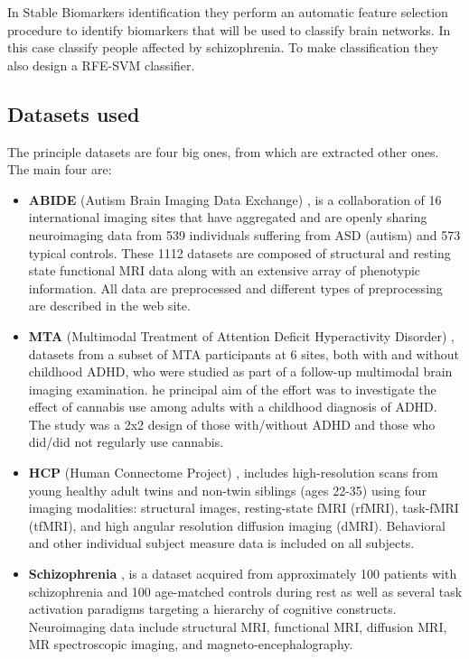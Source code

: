 In Stable Biomarkers identification they perform an automatic feature selection procedure to identify biomarkers that will be used to classify brain networks. In this case classify people affected by schizophrenia. To make classification they also design a RFE-SVM classifier. 

\subsection{Datasets used}
The principle datasets are four big ones, from which are extracted other ones. The main four are:
\begin{itemize}
	\item \textbf{ABIDE} (Autism Brain Imaging Data Exchange) \cite{Cameron2013TheNB}, is a collaboration of 16 international imaging sites that have aggregated and are openly sharing neuroimaging data from 539 individuals suffering from ASD (autism) and 573 typical controls. These 1112 datasets are composed of structural and resting state functional MRI data along with an extensive array of phenotypic information. All data are preprocessed and different types of preprocessing are described in the web site.
	\item  \textbf{MTA} (Multimodal Treatment of Attention Deficit Hyperactivity Disorder) \cite{mta}, datasets from a subset of MTA participants at 6 sites, both with and without childhood ADHD, who were studied as part of a follow-up multimodal brain imaging examination. he principal aim of the effort was to investigate the effect of cannabis use among adults with a childhood diagnosis of ADHD. The study was a 2x2 design of those with/without ADHD and those who did/did not regularly use cannabis.
	\item \textbf{HCP} (Human Connectome Project) \cite{Woolrich2001TemporalAI}, includes high-resolution scans from young healthy adult twins and non-twin siblings (ages 22-35) using four imaging modalities: structural images, resting-state fMRI (rfMRI), task-fMRI (tfMRI), and high angular resolution diffusion imaging (dMRI). Behavioral and other individual subject measure data is included on all subjects. 
	\item \textbf{Schizophrenia} \cite{schizo}, is a dataset acquired from approximately 100 patients with schizophrenia and 100 age-matched controls during rest as well as several task activation paradigms targeting a hierarchy of cognitive constructs. Neuroimaging data include structural MRI, functional MRI, diffusion MRI, MR spectroscopic imaging, and magneto-encephalography.
\end{itemize}

